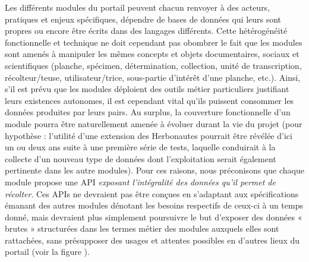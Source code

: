 \startchapter[title={Principes généraux des API dans l'écosystème eReColNat},reference=principes_api]

\startsection[title={Proposition de principe général}]

Les différents modules du portail peuvent chacun renvoyer à des acteurs, pratiques et enjeux spécifiques, dépendre de bases de données qui leurs sont propres ou encore être écrits dans des langages différents.
Cette hétérogénéité fonctionnelle et technique ne doit cependant pas obombrer le fait que les modules sont amenés à manipuler les mêmes concepts et objets documentaires, sociaux et scientifiques (planche, spécimen, détermination, collection, unité de transcription, récolteur/teuse, utilisateur/trice, sous-partie d'intérêt d'une planche, etc.).
Ainsi, s'il est prévu que les modules déploient des outils métier particuliers justifiant leurs existences autonomes, il est cependant vital qu'ils puissent consommer les données produites par leurs pairs.
Au surplus, la couverture fonctionnelle d'un module pourra être naturellement amenée à évoluer durant la vie du projet (pour hypothèse : l'utilité d'une extension des Herbonautes pourrait être révélée d'ici un ou deux ans suite à une première série de tests, laquelle conduirait à la collecte d'un nouveau type de données dont l'exploitation serait également pertinente dans les autre modules).
Pour ces raisons, nous préconisons que chaque module propose une API {\it exposant l'intégralité des données qu'il permet de récolter}.
Ces APIs ne devraient pas être conçues en s'adaptant aux spécifications émanant des autres modules dénotant les besoins respectifs de ceux-ci à un temps donné, mais devraient plus simplement poursuivre le but d'exposer des données « brutes » structurées dans les termes métier des modules auxquels elles sont rattachées, sans présupposer des usages et attentes possibles en d'autres lieux du portail (voir la figure \in[f:apis]).


\startsection[title={Avantages futurs en terme de gestion de projet}]

